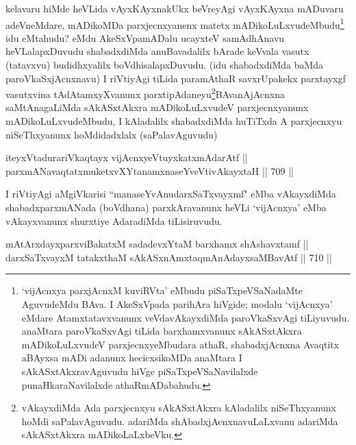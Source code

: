 \begin{artha} 
kelavaru hiMde heVLida vAyxKAyxnakUkx beVreyAgi vAyxKAyxna mADuvaru 
adeVneMdare, mADikoMDa parxjecnxyanenx matetx 
mADikoLuLxvudeMbudu\footnote{`vijAcnxya parxjAcnxM kuviRVta' eMbudu 
piSaTxpeVSaNadaMte AguvudeMdu BAva. I AkeSxVpada parihAra hiVgide; 
modalu `vijAcnxya' eMdare Atamxtatavxvanunx veVdavAkayxdiMda 
paroVkaSxvAgi tiLiyuvudu. anaMtara paroVkaSxvAgi tiLida barxhamxvanunx 
sAkASxtAkxra mADikoLuLxvudeV parxjecnxyeMbudara athaR, shabadxjAcnxna 
Avaqtitx aBAyxsa mADi adanunx hecicxsikoMDa anaMtara I 
sAkASxtAkxravAguvudu hiVge piSaTxpeVSaNavilalxde punaHkaraNavilalxde 
athaRmADabahudu.} idu eMtahudu? eMdu AkeSxVpamADalu 
ucayxteV samAdhAnavu heVLalapxDuvudu \ndash  shabadxdiMda anuBavadalilx 
bArade keVvala vasutx (tatavxvu) budidhxyalilx boVdhisalapxDuvudu. 
(idu shabadxdiMda baMda paroVkaSxjAcnxnavu) I riVtiyAgi tiLida 
paramAthaR savxrUpakekx parxtayxgf vasutxvina tAdAtamxyXvanunx 
parxtipAdaneyu\break \footnote{vAkayxdiMda Ada parxjecnxyu sAkASxtAkxra 
kAladalilx niSeThxyanunx hoMdi saPalavAguvudu. adariMda 
shAbadxjAcnxnavuLaLxvanu adariMda sAkASxtAkxra mADikoLaLxbeVku.}BAvanAjAcnxna saMtAnagaLiMda sAkASxtAkxra 
mADikoLuLxvudeV parxjecnxyanunx mADikoLuLxvudeMbudu, I kAladalilx 
shabadxdiMda huTiTxda A parxjecnxyu niSeThxyanunx hoMdidadxlalx 
(saPalavAguvudu) 
\end{artha}

\begin{shl}
iteyxVtadurariVkaqtayx vijAcnxyeVtuyxkatxmAdarAtf || \\
parxmANavaqtatxmuketxvXYtanamxnaseYveVtivAkayxtaH \hfill || 709 ||  
\end{shl}

\begin{artha} 
I riVtiyAgi aMgiVkarisi ``manaseYvAnudarxSaTxvayxmf" eMba vAkayxdiMda 
shabadxparxmANada (boVdhana) parxkAravanunx heVLi `vijAcnxya' eMba 
vAkayxvanunx shurxtiye AdaradiMda tiLisiruvudu.
\end{artha}


\begin{shl}
mAtArxdayxparxviBakatxM sadadevxYtaM barxhamx shAshavxtamf || \\
darxSaTxvayxM tatakxthaM sAkASxnAmxtaqmAnAdayxsaMBavAtf \hfill || 710 ||  
\end{shl}


